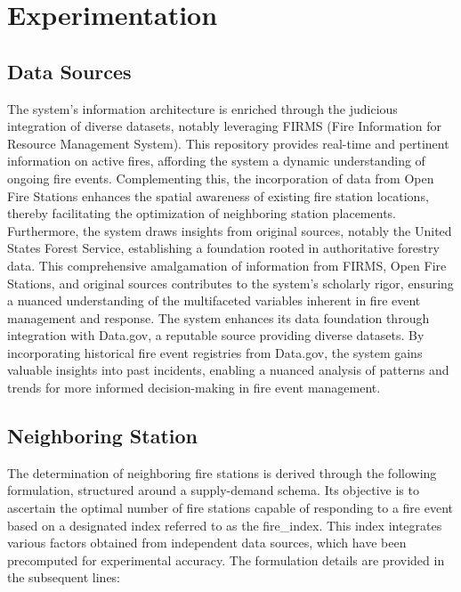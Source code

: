 \documentclass[lettersize,journal]{IEEEtran}
\begin{document}
\section{Experimentation}\label{Experimentation}


\subsection{Data Sources}
The system's information architecture is enriched through the judicious integration of diverse datasets, notably leveraging FIRMS (Fire Information for Resource Management System). This repository provides real-time and pertinent information on active fires, affording the system a dynamic understanding of ongoing fire events. Complementing this, the incorporation of data from Open Fire Stations enhances the spatial awareness of existing fire station locations, thereby facilitating the optimization of neighboring station placements. Furthermore, the system draws insights from original sources, notably the United States Forest Service, establishing a foundation rooted in authoritative forestry data. This comprehensive amalgamation of information from FIRMS, Open Fire Stations, and original sources contributes to the system's scholarly rigor, ensuring a nuanced understanding of the multifaceted variables inherent in fire event management and response.
The system enhances its data foundation through integration with Data.gov, a reputable source providing diverse datasets. By incorporating historical fire event registries from Data.gov, the system gains valuable insights into past incidents, enabling a nuanced analysis of patterns and trends for more informed decision-making in fire event management.

\subsection{Neighboring Station}


The determination of neighboring fire stations is derived through the following formulation, structured around a supply-demand schema. Its objective is to ascertain the optimal number of fire stations capable of responding to a fire event based on a designated index referred to as the fire\_index. This index integrates various factors obtained from independent data sources, which have been precomputed for experimental accuracy. The formulation details are provided in the subsequent lines:
\end{document}

